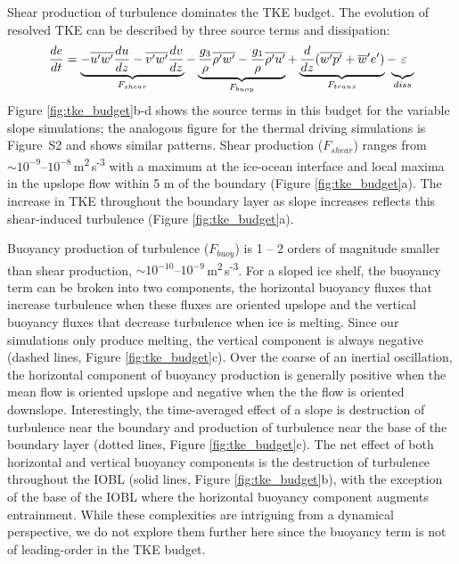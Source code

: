 \documentclass[draft]{styles/agujournal2019}
\begin{document}
Shear production of turbulence dominates the TKE budget. The evolution of resolved TKE can be described by three source terms and dissipation:
\[
    \frac{de}{dt} = 
        \underbrace{
            -\overline{u^{\prime}w^{\prime}}\frac{du}{dz} -\overline{v^{\prime}w^{\prime}}\frac{dv}{dz}}
        _{F_{shear}} - 
        \underbrace{
            \frac{g_3}{\rho}\overline{\rho^{\prime}w^{\prime}}        -\frac{g_1}{\rho}\overline{\rho^{\prime}u^{\prime}}}
        _{F_{buoy}} + 
        \underbrace{
            \frac{d}{dz}(\overline{w^{\prime}p^{\prime}} +
                     \overline{w}^{\prime}e^{\prime})}
        _{F_{trans}} -
        \hspace{-2mm}\underbrace{\frac{}{}\varepsilon}_{diss}
\]
Figure \ref{fig:tke_budget}b-d shows the source terms in this budget for the variable slope simulations; the analogous figure for the thermal driving simulations is Figure~S2 and shows similar patterns. Shear production ($F_{shear}$) ranges from $\sim 10^{-9} \textrm{--} 10^{-8}$\,m\textsuperscript{2}\,s\textsuperscript{-3} with a maximum at the ice-ocean interface and local maxima in the upslope flow within 5 m of the boundary (Figure \ref{fig:tke_budget}a). The increase in TKE throughout the boundary layer as slope increases reflects this shear-induced turbulence (Figure \ref{fig:tke_budget}a).

Buoyancy production of turbulence ($F_{buoy}$) is 1 -- 2 orders of magnitude smaller than shear production, $\sim\!10^{-10} \textrm{--} 10^{-9}$\,m\textsuperscript{2}\,s\textsuperscript{-3}. For a sloped ice shelf, the buoyancy term can be broken into two components, the horizontal buoyancy fluxes that increase turbulence when these fluxes are oriented upslope and the vertical buoyancy fluxes that decrease turbulence when ice is melting. Since our simulations only produce melting, the vertical component is always negative (dashed lines, Figure \ref{fig:tke_budget}c). Over the coarse of an inertial oscillation, the horizontal component of buoyancy production is generally positive when the mean flow is oriented upslope and negative when the the flow is oriented downslope. Interestingly, the time-averaged effect of a slope is destruction of turbulence near the boundary and production of turbulence near the base of the boundary layer (dotted lines, Figure \ref{fig:tke_budget}c). The net effect of both horizontal and vertical buoyancy components is the destruction of turbulence throughout the IOBL (solid lines, Figure \ref{fig:tke_budget}b), with the exception of the base of the IOBL where the horizontal buoyancy component augments entrainment. While these complexities are intriguing from a dynamical perspective, we do not explore them further here since the buoyancy term is not of leading-order in the TKE budget.
\end{document}
